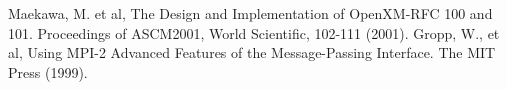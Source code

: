 \documentclass[12pt]{jarticle}
\begin{document}
\begin{thebibliography}{99}
Maekawa, M. et al, The Design and Implementation of OpenXM-RFC 100 and 101.
Proceedings of ASCM2001, World Scientific, 102-111 (2001).
Gropp, W., et al, Using MPI-2 Advanced Features of the Message-Passing 
Interface. The MIT Press (1999).
\end{thebibliography}
\end{document}

